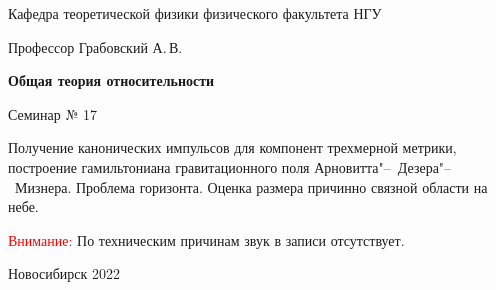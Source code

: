 \documentclass[12pt,pagesize,paper=192mm:108mm,landscape]{scrbook}
\begin{document}
\begin{titlepage}
\begin{center}
    Кафедра теоретической физики физического факультета НГУ

    \Large
    Профессор Грабовский А.\,В.

    \huge
    \textbf{Общая теория относительности}

    \Large
    Семинар № 17
    \vfill

    \normalsize
    \begin{minipage}{0.65\linewidth}
      Получение канонических импульсов для компонент трехмерной
      метрики, построение гамильтониана гравитационного поля
      Арновитта"--~Дезера"--~Мизнера. Проблема горизонта. Оценка
      размера причинно связной области на небе.
    \end{minipage}
    \vfill

    \begin{minipage}{0.90\linewidth}
      \textcolor{red}{Внимание:} По техническим причинам звук в записи отсутствует.
    \end{minipage}

    \normalsize \ccbysa\hspace{0.5em}  Новосибирск 2022
  \end{center}
\end{titlepage}
\end{document}
